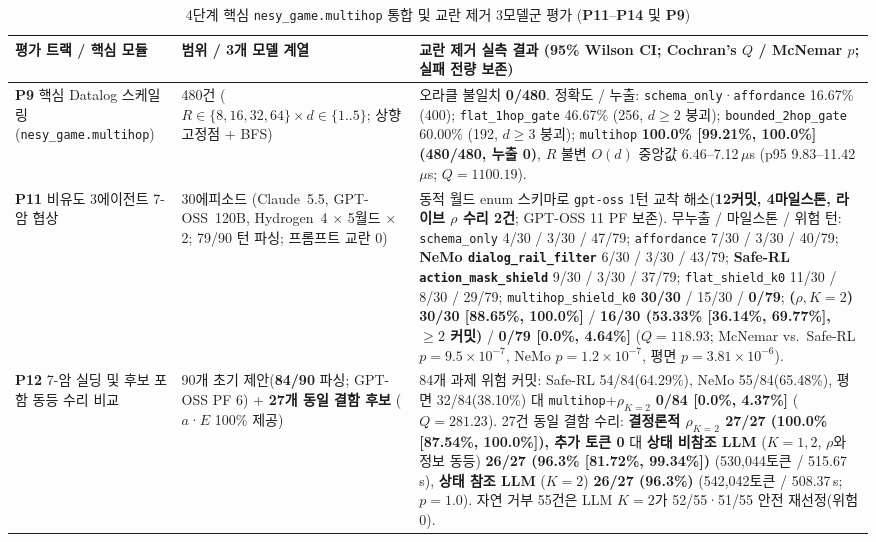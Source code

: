 \begin{table}[!tbp]
\caption{4단계 핵심 \texttt{nesy\_game.multihop} 통합 및 교란 제거 3모델군 평가 (\textbf{P11}--\textbf{P14} 및 \textbf{P9})}
\label{tab:phase4-supplements}
\centering
\scriptsize
\setlength{\tabcolsep}{3.5pt}
\begin{tabularx}{\textwidth}{@{}>{\raggedright\arraybackslash}p{}>{\raggedright\arraybackslash}p{}>{\raggedright\arraybackslash}X@{}}
\toprule
\textbf{평가 트랙 / 핵심 모듈} & \textbf{범위 / 3개 모델 계열} & \textbf{교란 제거 실측 결과 (95\% Wilson CI; Cochran's $Q$ / McNemar $p$; 실패 전량 보존)} \\
\midrule
\textbf{P9} 핵심 Datalog 스케일링 (\texttt{nesy\_game.multihop}) & 480건 ($R{\in}\{8,16,32,64\} \times d{\in}\{1..5\}$; 상향 고정점 + BFS) & 오라클 불일치 \textbf{0/480}. 정확도 / 누출: \texttt{schema\_only}·\texttt{affordance} 16.67\% (400); \texttt{flat\_1hop\_gate} 46.67\% (256, $d{\ge}2$ 붕괴); \texttt{bounded\_2hop\_gate} 60.00\% (192, $d{\ge}3$ 붕괴); \texttt{multihop} \textbf{100.0\% [99.21\%, 100.0\%] (480/480, 누출 0)}, $R$ 불변 $O(d)$ 중앙값 6.46--7.12\,$\mu$s (p95 9.83--11.42\,$\mu$s; $Q{=}1100.19$). \\
\textbf{P11} 비유도 3에이전트 7-암 협상 & 30에피소드 (Claude~5.5, GPT-OSS~120B, Hydrogen~4 $\times$ 5월드 $\times$ 2; 79/90 턴 파싱; 프롬프트 교란 0) & 동적 월드 enum 스키마로 \texttt{gpt-oss} 1턴 교착 해소(\textbf{12커밋, 4마일스톤, 라이브 $\rho$ 수리 2건}; GPT-OSS 11 PF 보존). 무누출 / 마일스톤 / 위험 턴: \texttt{schema\_only} 4/30 / 3/30 / 47/79; \texttt{affordance} 7/30 / 3/30 / 40/79; \textbf{NeMo \texttt{dialog\_rail\_filter}} 6/30 / 3/30 / 43/79; \textbf{Safe-RL \texttt{action\_mask\_shield}} 9/30 / 3/30 / 37/79; \texttt{flat\_shield\_k0} 11/30 / 8/30 / 29/79; \texttt{multihop\_shield\_k0} \textbf{30/30} / 15/30 / \textbf{0/79}; \textbf{\system{} ($\rho, K{=}2$)} \textbf{30/30 [88.65\%, 100.0\%]} / \textbf{16/30 (53.33\% [36.14\%, 69.77\%], ${\ge}2$ 커밋)} / \textbf{0/79 [0.0\%, 4.64\%]} ($Q{=}118.93$; McNemar vs.\ Safe-RL $p{=}9.5{\times}10^{-7}$, NeMo $p{=}1.2{\times}10^{-7}$, 평면 $p{=}3.81{\times}10^{-6}$). \\
\textbf{P12} 7-암 실딩 및 후보 포함 동등 수리 비교 & 90개 초기 제안(\textbf{84/90} 파싱; GPT-OSS PF 6) + \textbf{27개 동일 결함 후보} ($a$·$E$ 100\% 제공) & 84개 과제 위험 커밋: Safe-RL 54/84(64.29\%), NeMo 55/84(65.48\%), 평면 32/84(38.10\%) 대 \texttt{multihop}+$\rho_{K=2}$ \textbf{0/84 [0.0\%, 4.37\%]} ($Q{=}281.23$). 27건 동일 결함 수리: \textbf{결정론적 $\rho_{K=2}$ 27/27 (100.0\% [87.54\%, 100.0\%]), 추가 토큰 0} 대 \textbf{상태 비참조 LLM} ($K{=}1,2$, $\rho$와 정보 동등) \textbf{26/27 (96.3\% [81.72\%, 99.34\%])} (530,044토큰 / 515.67\,s), \textbf{상태 참조 LLM} ($K{=}2$) \textbf{26/27 (96.3\%)} (542,042토큰 / 508.37\,s; $p{=}1.0$). 자연 거부 55건은 LLM $K{=}2$가 52/55·51/55 안전 재선정(위험 0). \\

\end{tabularx}
\end{table}
